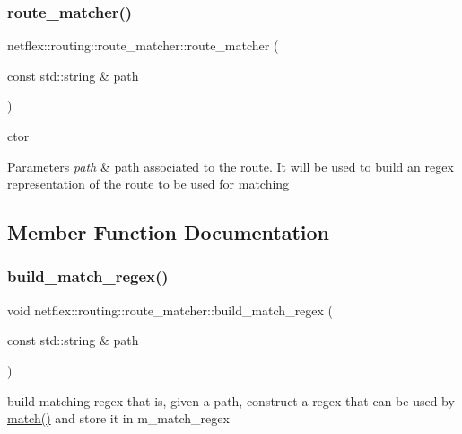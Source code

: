 \subsubsection{\texorpdfstring{route\+\_\+matcher()}{route\_matcher()}}
{\footnotesize\ttfamily netflex\+::routing\+::route\+\_\+matcher\+::route\+\_\+matcher (\begin{DoxyParamCaption}\item[{const std\+::string \&}]{path }\end{DoxyParamCaption})\hspace{0.3cm}{\ttfamily [explicit]}}

ctor


\begin{DoxyParams}{Parameters}
{\em path} & path associated to the route. It will be used to build an regex representation of the route to be used for matching \\
\hline
\end{DoxyParams}


\subsection{Member Function Documentation}
\mbox{\label{classnetflex_1_1routing_1_1route__matcher_a01bd617a02db70923d6088fa6ab466c5}} 
\subsubsection{\texorpdfstring{build\+\_\+match\+\_\+regex()}{build\_match\_regex()}}
{\footnotesize\ttfamily void netflex\+::routing\+::route\+\_\+matcher\+::build\+\_\+match\+\_\+regex (\begin{DoxyParamCaption}\item[{const std\+::string \&}]{path }\end{DoxyParamCaption})\hspace{0.3cm}{\ttfamily [protected]}}

build matching regex that is, given a path, construct a regex that can be used by \hyperlink{classnetflex_1_1routing_1_1route__matcher_ac0833b3f5d97b427ca9cc35ff95b477b}{match()} and store it in m\+\_\+match\+\_\+regex


